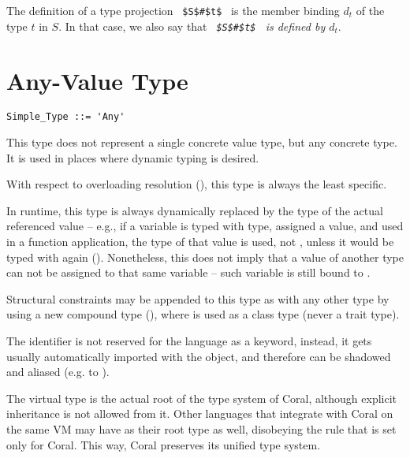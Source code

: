 \begin{enumerate}
The definition of a type projection ~\lstinline!$S$#$t$!~ is the member binding $d_t$ of the type $t$ in $S$. In that case, we also say that {\em ~\lstinline!$S$#$t$!~ is defined by $d_t$}. 

\end{enumerate}







\section{Any-Value Type}
\label{sec:any-value-type}

\syntax\begin{lstlisting}[morekeywords={Any}]
Simple_Type ::= 'Any'
\end{lstlisting}

This type does not represent a single concrete value type, but any concrete type. It is used in places where dynamic typing is desired. 

With respect to overloading resolution (), this type is always the least specific. 

In runtime, this type is always dynamically replaced by the type of the actual referenced value -- e.g., if a variable is typed with  type, assigned a value, and used in a function application, the type of that value is used, not , unless it would be typed with  again (). Nonetheless, this does not imply that a value of another type can not be assigned to that same variable -- such variable is still bound to . 

Structural constraints may be appended to this type as with any other type by using a new compound type (), where  is used as a class type (never a trait type).

The  identifier is not reserved for the language as a keyword, instead, it gets usually automatically imported with the  object, and therefore can be shadowed and aliased (e.g. to ). 

The  virtual type is the actual root of the type system of Coral, although explicit inheritance is not allowed from it. Other languages that integrate with Coral on the same VM may have  as their root type as well, disobeying the rule that is set only for Coral. This way, Coral preserves its unified type system. 





